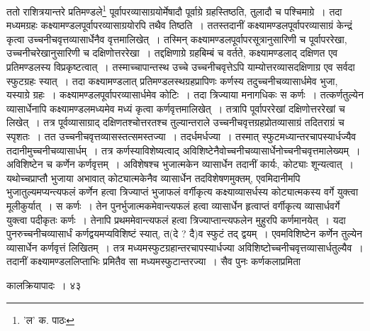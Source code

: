 \documentclass[11pt, openany]{book}
\begin{document}
{{{{{\vspace{0.3cm}
\noindent ततो राशित्रयान्तरे प्रतिमण्डले\renewcommand{\thefootnote}{१}\footnote{'ल' क. पाठः} पूर्वापरव्यासाग्रयोर्मेषादौ पूर्वाग्रे ग्रहस्तिष्ठति, तुलादौ च पश्चिमाग्रे~। तदा मध्यमग्रहः कक्ष्यामण्डलपूर्वापरव्यासाग्रयोरपि तथैव तिष्ठति~। ततस्तदानीं कक्ष्यामण्डलपूर्वापरव्यासाग्रं केन्द्रं कृत्वा उच्चनीचवृत्तव्यासार्धेनैव वृत्तमालिखेत्~। तस्मिन् कक्ष्यामण्डलपूर्वापरसूत्रानुसारिणी च पूर्वापररेखा, उच्चनीचरेखानुसारिणी च दक्षिणोत्तररेखा~। तद्दक्षिणाग्रे ग्रहबिम्बं च वर्तते, कक्ष्यामण्डलाद् दक्षिणत एव प्रतिमण्डलस्य विप्रकृष्टत्वात्~। तस्माच्चापान्तस्थ उच्चे उच्चनीचवृत्तेऽपि याम्योत्तरव्यासदक्षिणाग्र एव सर्वदा स्फुटग्रहः स्यात्~। तदा कक्ष्यामण्डलात् प्रतिमण्डलस्थग्रहप्रापिणः कर्णस्य तदुच्चनीचव्यासार्धमेव भुजा, यस्याग्रे ग्रहः~। कक्ष्यामण्डलपूर्वापरव्यासार्धमेव कोटिः~। तदा त्रिज्याया मनागधिकः स कर्णः~। तत्कर्णतुल्येन व्यासार्धेनापि कक्ष्यामण्डलमध्यमेव मध्यं कृत्वा कर्णवृत्तमालिखेत्~। तत्रापि पूर्वापररेखां
दक्षिणोत्तररेखां च लिखेत्~। तत्र पूर्वव्यासाग्राद् दक्षिणतश्चोत्तरतश्च तुल्यान्तराले उच्चनीचवृत्तग्रहप्रोतव्यासाग्रं तदितराग्रं च स्पृशतः~। तत उच्चनीचवृत्तव्यासस्तत्समस्तज्या~। तदर्धमर्धज्या~। तस्मात् स्फुटमध्यान्तरचापस्यार्धज्यैव तदानीमुच्चनीचव्यासार्धम्~। तत्र कर्णस्याविशेष्यत्वाद्
अविशिष्टेनैवोच्चनीचव्यासार्धेनोच्चनीचवृत्तमालेख्यम्~। अविशिष्टेन च कर्णेन कर्णवृत्तम्~। अविशेषश्च भुजात्मकेन व्यासार्धेन तदानीं कार्यः, कोट्याः
शून्यत्वात्~। यथोच्चप्राप्तौ भुजाया अभावात् कोट्यात्मकेनैव व्यासार्धेन तदविशेषणमुक्तम्, एवमिदानीमपि भुजातुल्यमप्यन्त्यफलं कर्णेन हत्वा
त्रिज्याप्तं भुजाफलं वर्गीकृत्य कक्ष्याव्यासर्धस्य कोट्यात्मकस्य वर्गे युक्त्वा मूलीकुर्यात्~। स कर्णः~। तेन पुनर्भुजात्मकमेवान्त्यफलं हत्वा व्यासार्धेन हृत्वाप्तं वर्गीकृत्य व्यासार्धवर्गे युक्त्वा पदीकृतः कर्णः~। तेनापि प्रथममेवान्त्यफलं हत्वा त्रिज्याप्तान्त्यफलेन मुहुरपि कर्णमानयेत्~। यदा पुनरुच्चनीचव्यासार्धं कर्णद्वयमप्यविशिष्टं स्यात्, त(दे ? दै)व स्फुटं तद् द्वयम्~। एवमविशिष्टेन कर्णेन तुल्येन व्यासार्धेन कर्णवृत्तं लिखितम्~। तत्र मध्यमस्फुटग्रहान्तरचापस्यार्धज्या अविशिष्टोच्चनीचवृत्तव्यासार्धतुल्यैव~। तदानीं कक्ष्यामण्डललिप्ताभिः प्रमितैव सा मध्यमस्फुटान्तरज्या~। सैव पुनः कर्णकलाप्रमिता

\newpage

\vspace{3cm}\hspace{4cm} कालक्रियापादः~।\hspace{4cm} ४३ 

}}}}}
\end{document}
